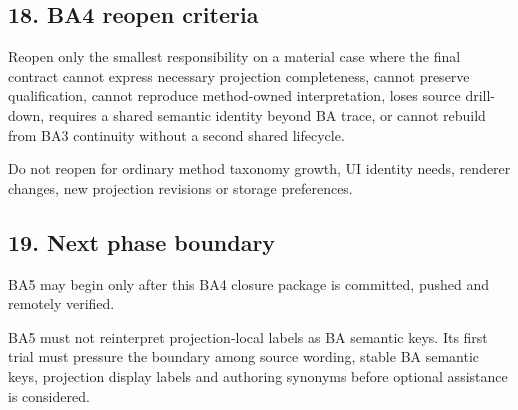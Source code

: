 \documentclass[
  11pt,
  a4paper,
]{article}
\begin{document}
\subsection{18. BA4 reopen criteria}\label{ba4-reopen-criteria}

Reopen only the smallest responsibility on a material case where the
final contract cannot express necessary projection completeness, cannot
preserve qualification, cannot reproduce method-owned interpretation,
loses source drill-down, requires a shared semantic identity beyond BA
trace, or cannot rebuild from BA3 continuity without a second shared
lifecycle.

Do not reopen for ordinary method taxonomy growth, UI identity needs,
renderer changes, new projection revisions or storage preferences.

\subsection{19. Next phase boundary}\label{next-phase-boundary}

BA5 may begin only after this BA4 closure package is committed, pushed
and remotely verified.

BA5 must not reinterpret projection-local labels as BA semantic keys.
Its first trial must pressure the boundary among source wording, stable
BA semantic keys, projection display labels and authoring synonyms
before optional assistance is considered.
\end{document}
